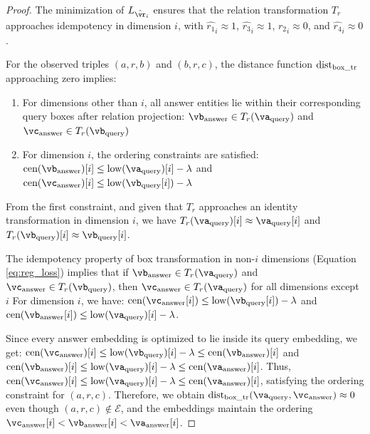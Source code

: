 \documentclass[runningheads]{llncs}
\newcommand{\lowc}[1]{\mbox{low}({#1})}
\newcommand{\cen}[1]{\mbox{cen}({#1})}
\newcommand{\proj}[2]{\hat{#1}_{#2}}
\newcommand{\dist}[1]{\mbox{dist}_{\scriptsize \mbox{#1}}}
\newcommand{\query}[1]{#1_{\mbox{\scriptsize query}}}
\newcommand{\answer}[1]{#1_{\mbox{\scriptsize answer}}}
\begin{document}
\begin{proof}
  The minimization of $L_{\proj{\vr}{i}}$ ensures that the relation
  transformation $T_r$ approaches idempotency in dimension $i$, with
  $\proj{r_1}{i} \approx 1$, $\proj{r_3}{i} \approx 1$,
  $\proj{r_2}{i} \approx 0$, and $\proj{r_4}{i} \approx 0$.
  
  For the observed triples $(a,r,b)$ and $(b,r,c)$, the distance
  function $\dist{box\_tr}$ approaching zero implies:
  
  \begin{enumerate}
  \item For dimensions other than $i$, all answer entities lie
    within their corresponding query boxes after relation projection:
    $\answer{\vb} \in T_r(\query{\va})$ and
    $\answer{\vc} \in T_r(\query{\vb})$
  
    \item For dimension $i$, the ordering constraints are satisfied:
    $\cen{\answer{\vb}}[i] \leq \lowc{\query{\va}}[i] - \lambda$ and
    $\cen{\answer{\vc}}[i] \leq \lowc{\query{\vb}[i]} - \lambda$
  \end{enumerate}
  From the first constraint, and given that $T_r$ approaches an
  identity transformation in dimension $i$, we have
  $T_r(\query{\va})[i] \approx \query{\va}[i]$ and
  $T_r(\query{\vb})[i] \approx \query{\vb}[i]$.
  
  The idempotency property of box transformation in non-$i$ dimensions
  (Equation \ref{eq:reg_loss}) implies that if
  $\answer{\vb} \in T_r(\query{\va})$ and
  $\answer{\vc} \in T_r(\query{\vb})$, then
  $\answer{\vc} \in T_r(\query{\va})$ for all dimensions except
  $i$
  For dimension $i$, we have:
  $\cen{\answer{\vc}[i]} \leq \lowc{\query{\vb}[i]} - \lambda$ and
  $\cen{\answer{\vb}[i]} \leq \lowc{\query{\va}}[i] - \lambda$.
  
  Since every answer embedding is optimized to lie inside its query
  embedding, we get:
  $\cen{\answer{\vc}}[i] \leq \lowc{\query{\vb}}[i] - \lambda \leq
  \cen{\answer{\vb}}[i]$ and
  $\cen{\answer{\vb}}[i] \leq \lowc{\query{\va}}[i] - \lambda \leq
  \cen{\answer{\va}}[i]$. Thus,
  $\cen{\answer{\vc}}[i] \leq \lowc{\query{\va}}[i] - \lambda \leq
  \cen{\answer{\va}}[i]$, satisfying the ordering constraint for
  $(a,r,c)$. Therefore, we obtain
  $\dist{box\_tr}(\query{\va}, \answer{\vc}) \approx 0$ even though
  $(a,r,c) \not\in \mathcal{E}$, and the embeddings maintain the
  ordering
  $\vc_{\mbox{\scriptsize answer}}[i] < \vb_{\mbox{\scriptsize
      answer}}[i] < \va_{\mbox{\scriptsize answer}}[i]$.
\end{proof}
\end{document}
